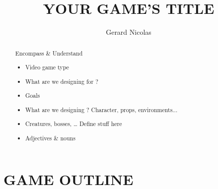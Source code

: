 \documentclass{report}
\begin{document}
\title{YOUR GAME’S TITLE}
\author{Gerard Nicolas}

\maketitle
\tableofcontents

\begin{abstract}


	Encompass \& Understand
	
	\begin{itemize}
		\item Video game type
	    \item What are we designing for ?
		\item Goals
	    \item What are we designing ? Character, props, environments...
	    \item Creatures, bosses, … Define stuff here
		\item Adjectives \& nouns
	\end{itemize}

\end{abstract}


\chapter{GAME OUTLINE}
\label{chap:outline}
	\begin{comment}
		Page 2 should include a few short paragraphs about the story 
		(beginning, middle, and ending ... or at least a cliffhanger) 
		mentioning the setting, the characters, and the conflict. 
		Gameplay description should give a brief idea of the flow of the game—break it into stages or bullet points if its easier to convey info that way.
	\end{comment}
\end{document}
